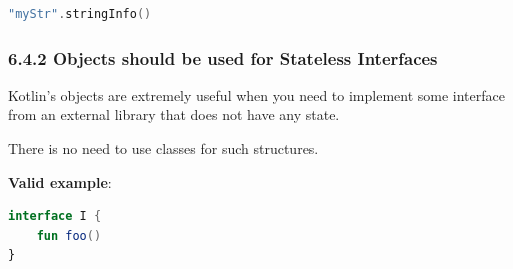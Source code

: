 {{{{{{{{{{{{\begin{lstlisting}[language=Kotlin]
"myStr".stringInfo()
\end{lstlisting}


\subsubsection*{\textbf{6.4.2 Objects should be used for Stateless Interfaces}}
\leavevmode\newline

\label{sec:6.4.2}

Kotlin’s objects are extremely useful when you need to implement some interface from an external library that does not have any state.

There is no need to use classes for such structures.



\textbf{Valid example}:

\begin{lstlisting}[language=Kotlin]
interface I {
    fun foo()
}


\end{lstlisting}}}}}}}}}}}}}
